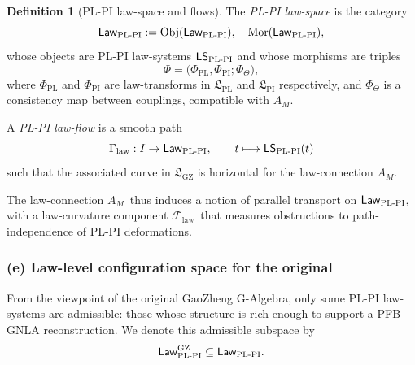 \documentclass[11pt]{book}
\theoremstyle{plain}
\theoremstyle{definition}
\newtheorem{definition}[theorem]{Definition} \theoremstyle{remark}
\newcommand{\GZLS}{\ensuremath{\mathfrak{L}_{\mathrm{GZ}}}}       \newcommand{\GZLT}{\ensuremath{M_{!w}}}                           \newcommand{\GZLOC}{\ensuremath{A_M}}                             \newcommand{\GZLCurv}{\ensuremath{\mathcal{F}_{\mathrm{law}}}}
\begin{document}
\begin{definition}[PL-PI law-space and flows]
The \emph{PL-PI law-space} is the category
  \[
    \mathsf{Law}_{\mathrm{PL\text- PI}}
    :=
    \mathrm{Obj}(\mathsf{Law}_{\mathrm{PL\text- PI}}),
    \quad
    \mathrm{Mor}(\mathsf{Law}_{\mathrm{PL\text- PI}}),
  \]
  whose objects are PL-PI law-systems
  $\mathsf{LS}_{\mathrm{PL\text- PI}}$ and whose morphisms are
  triples
  \[
    \Phi
    =
    \bigl(
      \Phi_{\mathrm{PL}},\Phi_{\mathrm{PI}};
      \Phi_\Theta
    \bigr),
  \]
  where $\Phi_{\mathrm{PL}}$ and $\Phi_{\mathrm{PI}}$ are law-transforms
  in $\mathfrak{L}_{\mathrm{PL}}$ and $\mathfrak{L}_{\mathrm{PI}}$
  respectively, and $\Phi_\Theta$ is a consistency map between
  couplings, compatible with \GZLOC.
  
  A \emph{PL-PI law-flow} is a smooth path
  \[
    \Gamma_{\mathrm{law}}:I\to\mathsf{Law}_{\mathrm{PL\text- PI}},
    \qquad
    t\longmapsto
    \mathsf{LS}_{\mathrm{PL\text- PI}}(t)
  \]
  such that the associated curve in $\GZLS$ is horizontal for the
  law-connection \GZLOC.
\end{definition}

The law-connection \GZLOC\ thus induces a notion of parallel transport
on $\mathsf{Law}_{\mathrm{PL\text- PI}}$, with a law-curvature
component \GZLCurv\ that measures obstructions to path-independence of
PL-PI deformations.



\subsubsection*{(e) Law-level configuration space for the original \texorpdfstring{\GAlgebra}{G-Algebra}}

From the viewpoint of the original GaoZheng G-Algebra, only some
PL-PI law-systems are admissible: those whose structure is rich enough
to support a PFB-GNLA reconstruction. We denote this admissible
subspace by
\[
   \mathsf{Law}_{\mathrm{PL\text- PI}}^{\mathrm{GZ}}
   \subseteq
   \mathsf{Law}_{\mathrm{PL\text- PI}}.
\]
\end{document}
